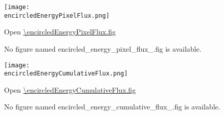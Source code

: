 \clearpage
\ifdefined \encircledEnergyPixelFlux

\begin{center}
  \texttt{[image: \\encircledEnergyPixelFlux.png]}
\end{center}

\encircledEnergyPixelFluxCaption

Open \url{\encircledEnergyPixelFlux.fig}

\else
No figure named encircled\_energy\_pixel\_flux\_\channelSuffix.fig is
available.
\fi

\vspace{5ex}

\clearpage
\ifdefined \encircledEnergyCumulativeFlux

\begin{center}
  \texttt{[image: \\encircledEnergyCumulativeFlux.png]}
\end{center}

\encircledEnergyCumulativeFluxCaption

Open \url{\encircledEnergyCumulativeFlux.fig}

\else
No figure named
encircled\_energy\_cumulative\_flux\_\channelSuffix.fig is available.
\fi

\clearpage
